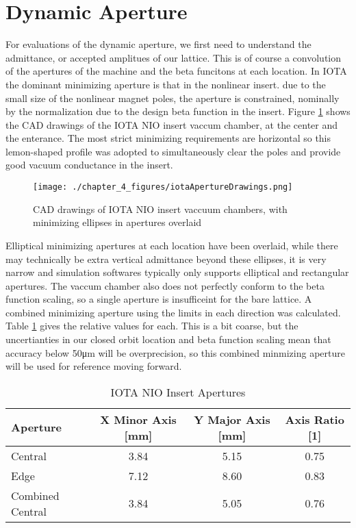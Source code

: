 \section{Dynamic Aperture} \label{sec:DA}
For evaluations of the dynamic aperture, we first need to understand the admittance, or accepted amplitues of our lattice. This is of course a convolution of the apertures of the machine and the beta funcitons at each location. In IOTA the dominant minimizing aperture is that in the nonlinear insert. due to the small size of the nonlinear magnet poles, the aperture is constrained, nominally by the normalization due to the design beta function in the insert. Figure \ref{fig:dnAperture} shows the CAD drawings of the IOTA NIO insert vaccum chamber, at the center and the enterance. The most strict minimizing requirements are horizontal so this lemon-shaped profile was adopted to simultaneously clear the poles and provide good vacuum conductance in the insert. 

\begin{figure}
	\centering
	\texttt{[image: ./chapter\_4\_figures/iotaApertureDrawings.png]}
	\caption{CAD drawings of IOTA NIO insert vaccuum chambers, with minimizing ellipses in apertures overlaid}
	\label{fig:dnAperture}
\end{figure}

Elliptical minimizing apertures at each location have been overlaid, while there may technically be extra vertical admittance beyond these ellipses, it is very narrow and simulation softwares typically only supports elliptical and rectangular apertures. The vaccum chamber also does not perfectly conform to the beta function scaling, so a single aperture is insufficeint for the bare lattice. A combined minimizing aperture using the limits in each direction was calculated. Table \ref{tab:dnAperture} gives the relative values for each. This is a bit coarse, but the uncertianties in our closed orbit location and beta function scaling mean that accuracy below 50\unit{\micro m} will be overprecision, so this combined minmizing aperture will be used for reference moving forward.

\begin{table}
    \centering
    \begin{tabular}{lccc}
    \toprule
    \textbf{Aperture} & \textbf{X Minor Axis} [mm] & \textbf{Y Major Axis} [mm] & \textbf{Axis Ratio} [1]\\
    \midrule
    Central & 3.84 & 5.15 & 0.75\\
    Edge  & 7.12 & 8.60 & 0.83\\
    Combined Central  & 3.84 & 5.05 & 0.76\\
    \bottomrule
    \end{tabular}
    \caption{IOTA NIO Insert Apertures}
    \label{tab:dnAperture}
\end{table}

